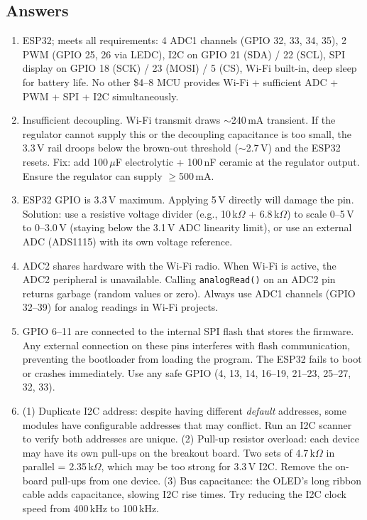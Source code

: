 \subsection{Answers}
\begin{enumerate}[leftmargin=1.5em]
\item ESP32; meets all requirements: 4 ADC1 channels (GPIO 32, 33, 34, 35), 2 PWM (GPIO 25, 26 via LEDC), I2C on GPIO 21 (SDA) / 22 (SCL), SPI display on GPIO 18 (SCK) / 23 (MOSI) / 5 (CS), Wi-Fi built-in, deep sleep for battery life. No other \$4--8 MCU provides Wi-Fi + sufficient ADC + PWM + SPI + I2C simultaneously.
\item Insufficient decoupling. Wi-Fi transmit draws $\sim$240\,mA transient. If the regulator cannot supply this or the decoupling capacitance is too small, the 3.3\,V rail droops below the brown-out threshold ($\sim$2.7\,V) and the ESP32 resets. Fix: add 100\,$\mu$F electrolytic + 100\,nF ceramic at the regulator output. Ensure the regulator can supply $\geq$500\,mA.
\item ESP32 GPIO is 3.3\,V maximum. Applying 5\,V directly will damage the pin. Solution: use a resistive voltage divider (e.g., 10\,k$\Omega$ + 6.8\,k$\Omega$) to scale 0--5\,V to 0--3.0\,V (staying below the 3.1\,V ADC linearity limit), or use an external ADC (ADS1115) with its own voltage reference.
\item ADC2 shares hardware with the Wi-Fi radio. When Wi-Fi is active, the ADC2 peripheral is unavailable. Calling \texttt{analogRead()} on an ADC2 pin returns garbage (random values or zero). Always use ADC1 channels (GPIO 32--39) for analog readings in Wi-Fi projects.
\item GPIO 6--11 are connected to the internal SPI flash that stores the firmware. Any external connection on these pins interferes with flash communication, preventing the bootloader from loading the program. The ESP32 fails to boot or crashes immediately. Use any safe GPIO (4, 13, 14, 16--19, 21--23, 25--27, 32, 33).
\item (1) Duplicate I2C address: despite having different \emph{default} addresses, some modules have configurable addresses that may conflict. Run an I2C scanner to verify both addresses are unique. (2) Pull-up resistor overload: each device may have its own pull-ups on the breakout board. Two sets of 4.7\,k$\Omega$ in parallel = 2.35\,k$\Omega$, which may be too strong for 3.3\,V I2C. Remove the on-board pull-ups from one device. (3) Bus capacitance: the OLED's long ribbon cable adds capacitance, slowing I2C rise times. Try reducing the I2C clock speed from 400\,kHz to 100\,kHz.

\end{enumerate}
